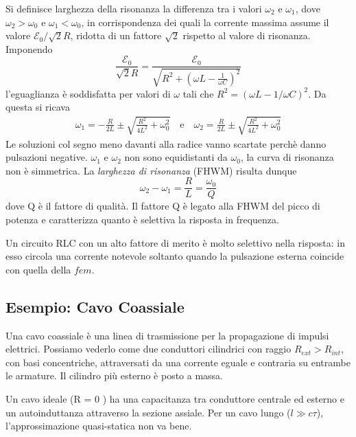 Si definisce larghezza della risonanza la differenza tra i valori $\omega_2$ e $\omega_1$, dove $\omega_2 > \omega_0$ e $\omega_1 < \omega_0$, in corrispondenza dei quali la corrente massima assume il valore $\mathcal{E}_0 / \sqrt{2}R$, ridotta di un fattore $\sqrt{2}$ rispetto al valore di risonanza. Imponendo
\begin{equation*}
	\frac{\mathcal{E}_0}{\sqrt{2}R} = \frac{\mathcal{E}_0}{\sqrt{R^2 + \left(\omega L - \frac{1}{\omega C}\right)^2}}
\end{equation*}
l'eguaglianza \`e soddisfatta per valori di $\omega$ tali che $R^2 = (\omega L - 1/\omega C)^2$. Da questa si ricava
\begin{align*}
	\omega_1 = - \frac{R}{2L} \pm \sqrt{\frac{R^2}{4L^2} + \omega_0^2} \quad \text{e} \quad \omega_2 = \frac{R}{2L} \pm \sqrt{\frac{R^2}{4L^2}+\omega_0^2}
\end{align*}
Le soluzioni col segno meno davanti alla radice vanno scartate perch\`e danno pulsazioni negative. $\omega_1$ e $\omega_2$ non sono equidistanti da $\omega_0$, la curva di risonanza non \`e simmetrica. La \textit{larghezza di risonanza }(FHWM) risulta dunque 
\begin{equation}
	\omega_2 - \omega_1 = \frac{R}{L} = \frac{\omega_0}{Q}
\end{equation}
dove Q \`e il fattore di qualit\`a. Il fattore Q \`e legato alla FHWM del picco di potenza e caratterizza quanto \`e selettiva la risposta in frequenza. 

Un circuito RLC con un alto fattore di merito \`e molto selettivo nella risposta: in esso circola una corrente notevole soltanto quando la pulsazione esterna coincide con quella della $fem$. 

\subsection{Esempio: Cavo Coassiale}


Una cavo coassiale \`e una linea di trasmissione per la propagazione di impulsi elettrici. Possiamo vederlo come due conduttori cilindrici con raggio $R_{ext} > R_{int}$, con basi concentriche, attraversati da una corrente eguale e contraria su entrambe le armature. Il cilindro pi\`u esterno \`e posto a massa.

Un cavo ideale (R = 0 ) ha una capacitanza tra conduttore centrale ed esterno e un autoinduttanza attraverso la sezione assiale. Per un cavo lungo ($l \gg c \tau$), l'approssimazione quasi-statica non va bene.


